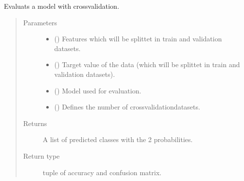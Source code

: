 \documentclass[letterpaper,10pt,english]{sphinxmanual}
\begin{document}

\begin{fulllineitems}
\label{\detokenize{anoog.model:anoog.model.model.evaluate_model_with_cross_validation}}
\sphinxAtStartPar
Evaluats a model with cross\sphinxhyphen{}validation.
\begin{quote}\begin{description}
\item[{Parameters}] \leavevmode\begin{itemize}
\item {} 
\sphinxAtStartPar
{} () \textendash{} Features which will be splittet in train and validation datasets.

\item {} 
\sphinxAtStartPar
{} () \textendash{} Target value of the data (which will be splittet in train and validation datasets).

\item {} 
\sphinxAtStartPar
{} ({\hyperref[\detokenize{anoog.model:anoog.model.model.MODELS}]{}}) \textendash{} Model used for evaluation.

\item {} 
\sphinxAtStartPar
{} (\sphinxstyleliteralemphasis{\sphinxupquote{, }}) \textendash{} Defines the number of cross\sphinxhyphen{}validation\sphinxhyphen{}datasets.

\end{itemize}

\item[{Returns}] \leavevmode
\sphinxAtStartPar
A list of predicted classes with the 2 probabilities.

\item[{Return type}] \leavevmode
\sphinxAtStartPar
tuple of accuracy and confusion matrix.

\end{description}\end{quote}

\end{fulllineitems}
\end{document}
